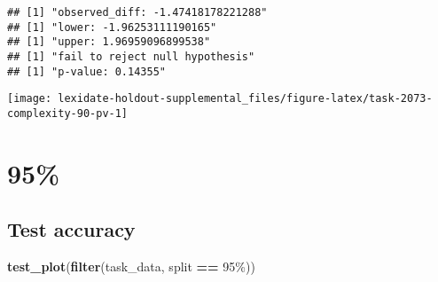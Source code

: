 \documentclass[
]{book}
\newenvironment{Shaded}{\begin{snugshade}}{\end{snugshade}}
\newcommand{\AttributeTok}[1]{\textcolor[rgb]{0.13,0.29,0.53}{#1}}
\newcommand{\DecValTok}[1]{\textcolor[rgb]{0.00,0.00,0.81}{#1}}
\newcommand{\FunctionTok}[1]{\textcolor[rgb]{0.13,0.29,0.53}{\textbf{#1}}}
\newcommand{\NormalTok}[1]{#1}
\newcommand{\OtherTok}[1]{\textcolor[rgb]{0.56,0.35,0.01}{#1}}
\newcommand{\SpecialCharTok}[1]{\textcolor[rgb]{0.81,0.36,0.00}{\textbf{#1}}}
\newcommand{\StringTok}[1]{\textcolor[rgb]{0.31,0.60,0.02}{#1}}
\begin{document}
\begin{Shaded}
\end{Shaded}

\begin{verbatim}
## [1] "observed_diff: -1.47418178221288"
## [1] "lower: -1.96253111190165"
## [1] "upper: 1.96959096899538"
## [1] "fail to reject null hypothesis"
## [1] "p-value: 0.14355"
\end{verbatim}

\texttt{[image: lexidate-holdout-supplemental\_files/figure-latex/task-2073-complexity-90-pv-1]}

\hypertarget{section-44}{%
\section{95\%}\label{section-44}}

\hypertarget{test-accuracy-44}{%
\subsection{Test accuracy}\label{test-accuracy-44}}

\begin{Shaded}
\begin{Highlighting}[]
\FunctionTok{test\_plot}\NormalTok{(}\FunctionTok{filter}\NormalTok{(task\_data, split }\SpecialCharTok{==} \StringTok{\textquotesingle{}95\%\textquotesingle{}}\NormalTok{))}
\end{Highlighting}
\end{Shaded}
\end{document}
